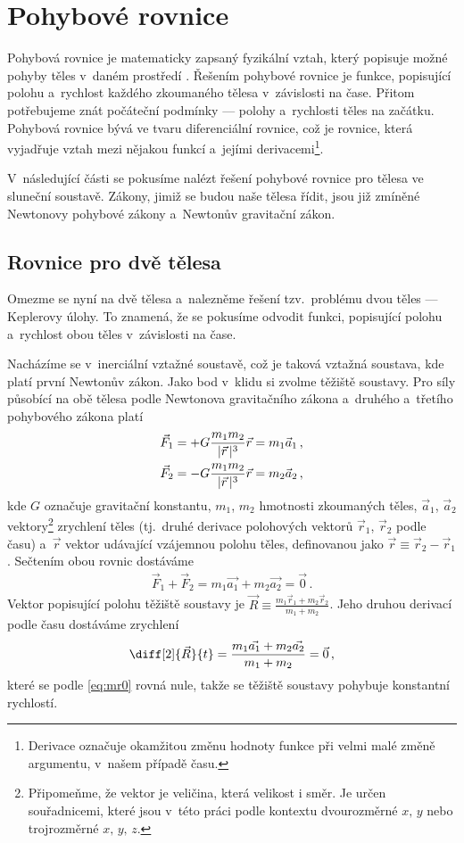\documentclass[A4paper, 12pt, oneside]{book}
\begin{document}
\section{Pohybové rovnice}
Pohybová rovnice je matematicky zapsaný fyzikální vztah, který popisuje možné pohyby těles v~daném prostředí \cite{wiki:eqm}. Řešením pohybové rovnice je funkce, popisující polohu a~rychlost každého zkoumaného tělesa v~závislosti na čase. Přitom potřebujeme znát počáteční podmínky --- polohy a~rychlosti těles na začátku. Pohybová rovnice bývá ve tvaru diferenciální rovnice, což je rovnice, která vyjadřuje vztah mezi nějakou funkcí a~jejími derivacemi\footnote{Derivace označuje okamžitou změnu hodnoty funkce při velmi malé změně argumentu, v~našem případě času.}.

V~následující části se pokusíme nalézt řešení pohybové rovnice pro tělesa ve sluneční soustavě. Zákony, jimiž se budou naše tělesa řídit, jsou již zmíněné Newtonovy pohybové zákony a~Newtonův gravitační zákon.
\subsection{Rovnice pro dvě tělesa} \label{sec:2body}
Omezme se nyní na dvě tělesa a~nalezněme řešení tzv.\ problému dvou těles --- Keplerovy úlohy. To znamená, že se pokusíme odvodit funkci, popisující polohu a~rychlost obou těles v~závislosti na čase. 

Nacházíme se v~inerciální vztažné soustavě, což je taková vztažná soustava, kde platí první Newtonův zákon. Jako bod v~klidu si zvolme těžiště soustavy. Pro síly působící na obě tělesa podle Newtonova gravitačního zákona a~druhého a~třetího pohybového zákona platí
\begin{align} 
	\vec{F}_1 &= +G\frac{m_1m_2}{\lvert \vec{r} \,\rvert^3}\vec{r} = m_1\vec{a}_1\,, \label{eq:newton1} \\
	\vec{F}_2 &= -G\frac{m_1m_2}{\lvert \vec{r} \,\rvert^3}\vec{r} = m_2\vec{a}_2\,, \label{eq:newton2}
\end{align}
kde $G$ označuje gravitační konstantu, $m_1$, $m_2$ hmotnosti zkoumaných těles, $\vec{a}_1$, $\vec{a}_2$ vektory\footnote{Připomeňme, že vektor je veličina, která velikost i směr. Je určen souřadnicemi, které jsou v~této práci podle kontextu dvourozměrné $x,\,y$ nebo trojrozměrné $x,\,y,\,z$.}  zrychlení těles (tj.\ druhé derivace polohových vektorů $\vec{r}_1$, $\vec{r}_2$ podle času) a~$\vec{r}$ vektor udávající vzájemnou polohu těles, definovanou jako $\vec{r} \equiv \vec{r}_2 - \vec{r}_1$. Sečtením obou rovnic dostáváme
\begin{align} \label{eq:mr0}
	\vec{F}_1 + \vec{F}_2 = m_1\vec{a_1} + m_2\vec{a_2} = \vec{0}\,.
\end{align}
Vektor popisující polohu těžiště soustavy je $\vec{R} \equiv \frac{m_1\vec{r}_1 + m_2\vec{r}_2}{m_1 + m_2}$. Jeho druhou derivací podle času dostáváme zrychlení
\begin{align}
	\diff[2]{\vec{R}}{t} = \frac{m_1\vec{a_1} + m_2\vec{a_2}}{m_1+m_2} = \vec{0}\,,
\end{align}
které se podle \eqref{eq:mr0} rovná nule, takže se těžiště soustavy pohybuje konstantní rychlostí.
\end{document}

